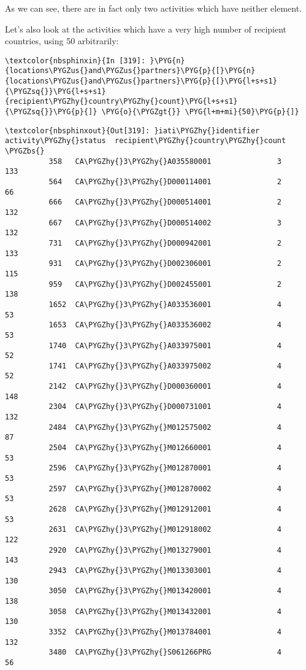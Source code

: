 \documentclass[letterpaper,10pt,english]{sphinxmanual}
\begin{document}
As we can see, there are in fact only two activities which have neither
element.

Let's also look at the activities which have a very high number of
recipient countries, using 50 arbitrarily:

\begin{Verbatim}[commandchars=\\\{\}]
\textcolor{nbsphinxin}{In [319]: }\PYG{n}{locations\PYGZus{}and\PYGZus{}partners}\PYG{p}{[}\PYG{n}{locations\PYGZus{}and\PYGZus{}partners}\PYG{p}{[}\PYG{l+s+s1}{\PYGZsq{}}\PYG{l+s+s1}{recipient\PYGZhy{}country\PYGZhy{}count}\PYG{l+s+s1}{\PYGZsq{}}\PYG{p}{]} \PYG{o}{\PYGZgt{}} \PYG{l+m+mi}{50}\PYG{p}{]}
\end{Verbatim}

\begin{Verbatim}[commandchars=\\\{\}]
\textcolor{nbsphinxout}{Out[319]: }iati\PYGZhy{}identifier activity\PYGZhy{}status  recipient\PYGZhy{}country\PYGZhy{}count  \PYGZbs{}
          358   CA\PYGZhy{}3\PYGZhy{}A035580001               3                      133
          564   CA\PYGZhy{}3\PYGZhy{}D000114001               2                       66
          666   CA\PYGZhy{}3\PYGZhy{}D000514001               2                      132
          667   CA\PYGZhy{}3\PYGZhy{}D000514002               3                      132
          731   CA\PYGZhy{}3\PYGZhy{}D000942001               2                      133
          931   CA\PYGZhy{}3\PYGZhy{}D002306001               2                      115
          959   CA\PYGZhy{}3\PYGZhy{}D002455001               2                      138
          1652  CA\PYGZhy{}3\PYGZhy{}A033536001               4                       53
          1653  CA\PYGZhy{}3\PYGZhy{}A033536002               4                       53
          1740  CA\PYGZhy{}3\PYGZhy{}A033975001               4                       52
          1741  CA\PYGZhy{}3\PYGZhy{}A033975002               4                       52
          2142  CA\PYGZhy{}3\PYGZhy{}D000360001               4                      148
          2304  CA\PYGZhy{}3\PYGZhy{}D000731001               4                      132
          2484  CA\PYGZhy{}3\PYGZhy{}M012575002               4                       87
          2504  CA\PYGZhy{}3\PYGZhy{}M012660001               4                       53
          2596  CA\PYGZhy{}3\PYGZhy{}M012870001               4                       53
          2597  CA\PYGZhy{}3\PYGZhy{}M012870002               4                       53
          2628  CA\PYGZhy{}3\PYGZhy{}M012912001               4                       53
          2631  CA\PYGZhy{}3\PYGZhy{}M012918002               4                      122
          2920  CA\PYGZhy{}3\PYGZhy{}M013279001               4                      143
          2943  CA\PYGZhy{}3\PYGZhy{}M013303001               4                      130
          3050  CA\PYGZhy{}3\PYGZhy{}M013420001               4                      138
          3058  CA\PYGZhy{}3\PYGZhy{}M013432001               4                      130
          3352  CA\PYGZhy{}3\PYGZhy{}M013784001               4                      132
          3480  CA\PYGZhy{}3\PYGZhy{}S061266PRG               4                       56
          

\end{Verbatim}
\end{document}
